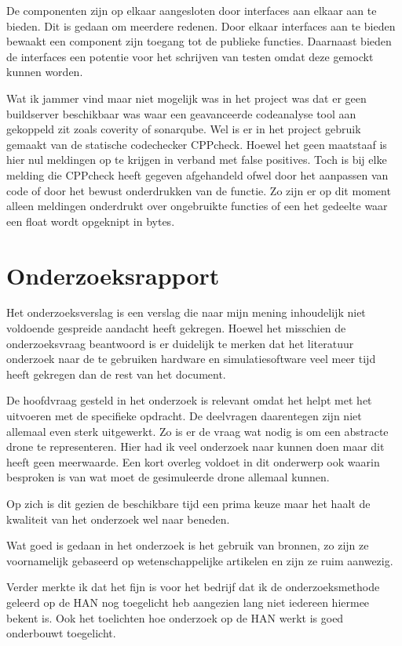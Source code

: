 \documentclass[a4paper, 11pt, oneside]{report}
\begin{document}
De componenten zijn op elkaar aangesloten door interfaces aan elkaar aan te bieden.
Dit is gedaan om meerdere redenen. 
Door elkaar interfaces aan te bieden bewaakt een component zijn toegang tot de publieke functies.
Daarnaast bieden de interfaces een potentie voor het schrijven van testen omdat deze gemockt kunnen worden.  

Wat ik jammer vind maar niet mogelijk was in het project was dat er geen buildserver beschikbaar was waar een geavanceerde codeanalyse tool aan gekoppeld zit zoals coverity of sonarqube. Wel is er in het project gebruik gemaakt van de statische codechecker CPPcheck. Hoewel het geen maatstaaf is hier nul meldingen op te krijgen in verband met false positives. 
Toch is bij elke melding die CPPcheck heeft gegeven afgehandeld ofwel door het aanpassen van code of door het bewust onderdrukken van de functie. Zo zijn er op dit moment alleen meldingen onderdrukt over ongebruikte functies of een het gedeelte waar een float wordt opgeknipt in bytes.
  
\section{Onderzoeksrapport}\label{sec:onderzoeksrapport}

Het onderzoeksverslag is een verslag die naar mijn mening inhoudelijk niet voldoende gespreide aandacht heeft gekregen. Hoewel het misschien de onderzoeksvraag beantwoord is er duidelijk te merken dat het literatuur onderzoek naar de te gebruiken hardware en simulatiesoftware veel meer tijd heeft gekregen dan de rest van het document.

De hoofdvraag gesteld in het onderzoek is relevant omdat het helpt met het uitvoeren met de specifieke opdracht.
De deelvragen daarentegen zijn niet allemaal even sterk uitgewerkt. 
Zo is er de vraag wat nodig is om een abstracte drone te representeren. 
Hier had ik veel onderzoek naar kunnen doen maar dit heeft geen meerwaarde. 
Een kort overleg voldoet in dit onderwerp ook waarin besproken is van wat moet de gesimuleerde drone allemaal kunnen.

Op zich is dit gezien de beschikbare tijd een prima keuze maar het haalt de kwaliteit van het onderzoek wel naar beneden.

Wat goed is gedaan in het onderzoek is het gebruik van bronnen, zo zijn ze voornamelijk gebaseerd op wetenschappelijke artikelen en zijn ze ruim aanwezig.

Verder merkte ik dat het fijn is voor het bedrijf dat ik de onderzoeksmethode geleerd op de HAN nog toegelicht heb aangezien lang niet iedereen hiermee bekent is. Ook het toelichten hoe onderzoek op de HAN werkt is goed onderbouwt toegelicht.
  
\end{document}
